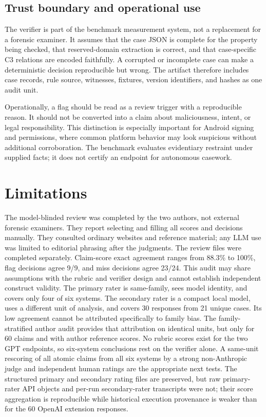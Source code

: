 \documentclass[conference]{IEEEtran}
\begin{document}
\subsection{Trust boundary and operational use}
The verifier is part of the benchmark measurement system, not a replacement for
a forensic examiner. It assumes that the case JSON is complete for the property
being checked, that reserved-domain extraction is correct, and that case-specific
C3 relations are encoded faithfully. A corrupted or incomplete case can make a
deterministic decision reproducible but wrong. The artifact therefore includes
case records, rule source, witnesses, fixtures, version identifiers, and hashes
as one audit unit.

Operationally, a flag should be read as a review trigger with a reproducible
reason. It should not be converted into a claim about maliciousness, intent, or
legal responsibility. This distinction is especially important for Android
signing and permissions, where common platform behavior may look suspicious
without additional corroboration. The benchmark evaluates evidentiary restraint
under supplied facts; it does not certify an endpoint for autonomous casework.

\section{Limitations}
The model-blinded review was completed by the two authors, not external forensic
examiners. They report selecting and filling all scores and decisions manually.
They consulted ordinary websites and reference material; any LLM use was limited
to editorial phrasing after the judgments. The review files were completed
separately. Claim-score exact agreement ranges from 88.3\% to 100\%, flag
decisions agree 9/9, and miss decisions agree 23/24. This audit may share
assumptions with the rubric and verifier design and cannot establish independent
construct validity.
The primary rater is same-family, sees model identity, and covers only four of
six systems.
The secondary rater is a compact local model, uses a different unit of analysis,
and covers 30 responses from 21 unique cases. Its low agreement cannot be
attributed specifically to family bias. The family-stratified author audit
provides that attribution on identical units, but only for 60 claims and with
author reference scores. No rubric scores exist for the two GPT endpoints, so
six-system conclusions rest on the verifier alone. A same-unit rescoring of all
atomic claims from all six systems by a strong non-Anthropic judge and
independent human ratings are the appropriate next tests.
The structured primary and secondary rating files are preserved, but raw
primary-rater API objects and per-run secondary-rater transcripts were not;
their score aggregation is reproducible while historical execution provenance
is weaker than for the 60 OpenAI extension responses.
\end{document}
